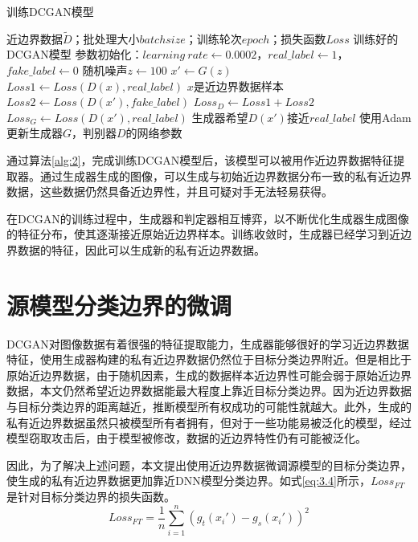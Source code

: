 \begin{algorithm}[!h] 
	\caption{\small 训练DCGAN模型}
	\label{alg:2}
	\small
	\begin{algorithmic}[1]
		\Require 近边界数据$\tilde{D}$；批处理大小$batchsize$；训练轮次$epoch$；损失函数$Loss$
		\Ensure 训练好的DCGAN模型
		\State 参数初始化：$learning \ rate \gets 0.0002$，$real\_label \gets 1$，$fake\_label \gets 0$
		\State 随机噪声$z \gets 100$ 
		\State $x' \gets G(z)$
		\State $Loss1 \gets Loss(D(x), real\_label)$  \Comment $x$是近边界数据样本
		\State $Loss2 \gets Loss(D(x'), fake\_label)$
		\State $Loss_D \gets Loss1 + Loss2$
		\State $Loss_G \gets Loss(D(x'), real\_label)$ \Comment 生成器希望$D(x') $接近$real\_label$
		\State 使用Adam更新生成器$G$，判别器$D$的网络参数
		\EndFor
	\end{algorithmic}
	
\end{algorithm}

通过算法\ref{alg:2}，完成训练DCGAN模型后，该模型可以被用作近边界数据特征提取器。通过生成器生成的图像，可以生成与初始近边界数据分布一致的私有近边界数据，这些数据仍然具备近边界性，并且可疑对手无法轻易获得。

在DCGAN的训练过程中，生成器和判定器相互博弈，以不断优化生成器生成图像的特征分布，使其逐渐接近原始近边界样本。训练收敛时，生成器已经学习到近边界数据的特征，因此可以生成新的私有近边界数据。

\section{源模型分类边界的微调}\label{4.2}

DCGAN对图像数据有着很强的特征提取能力，生成器能够很好的学习近边界数据特征，使用生成器构建的私有近边界数据仍然位于目标分类边界附近。但是相比于原始近边界数据，由于随机因素，生成的数据样本近边界性可能会弱于原始近边界数据，本文仍然希望近边界数据能最大程度上靠近目标分类边界。因为近边界数据与目标分类边界的距离越近，推断模型所有权成功的可能性就越大。此外，生成的私有近边界数据虽然只被模型所有者拥有，但对于一些功能易被泛化的模型，经过模型窃取攻击后，由于模型被修改，数据的近边界特性仍有可能被泛化。

因此，为了解决上述问题，本文提出使用近边界数据微调源模型的目标分类边界，使生成的私有近边界数据更加靠近DNN模型分类边界。如式\ref{eq:3.4}所示，$Loss_{FT}$是针对目标分类边界的损失函数。
\begin{equation}
	\label{eq:3.9}
	Loss_{FT} = \frac{1}{n} \sum^{n}_{i = 1} (g_t(x_i') - g_s(x_i'))^2
\end{equation}


